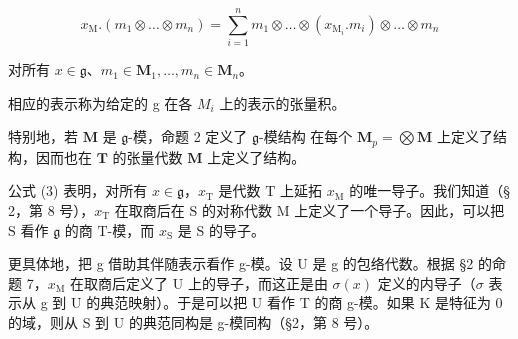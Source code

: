 \[
x _ {\mathrm{M}}. (m _ {1} \otimes \dots \otimes m _ {n}) = \sum_ {i = 1} ^ {n} m _ {1} \otimes \dots \otimes (x _ {\mathrm{M} _ {i}}. m _ {i}) \otimes \dots \otimes m _ {n}\tag{3}
\]

对所有 \(x \in \mathfrak{g}\)、\(m_1 \in \mathbf{M}_1, \ldots, m_n \in \mathbf{M}_n\)。

相应的表示称为给定的 g 在各 \(M_{i}\) 上的表示的张量积。

特别地，若 \(\mathbf{M}\) 是 \(\mathfrak{g}\)-模，命题 2 定义了 \(\mathfrak{g}\)-模结构
在每个 \(\mathbf{M}_p = \bigotimes \mathbf{M}\) 上定义了结构，因而也在 \(\mathbf{T}\) 的张量代数 \(\mathbf{M}\) 上定义了结构。

公式 (3) 表明，对所有 \(x \in \mathfrak{g}\)，\(x_{\mathrm{T}}\) 是代数 \(\mathrm{T}\) 上延拓 \(x_{\mathrm{M}}\) 的唯一导子。我们知道（§ 2，第 8 号），\(x_{\mathrm{T}}\) 在取商后在 \(\mathrm{S}\) 的对称代数 \(\mathrm{M}\) 上定义了一个导子。因此，可以把 \(\mathrm{S}\) 看作 \(\mathfrak{g}\) 的商 \(\mathrm{T}\)-模，而 \(x_{\mathrm{S}}\) 是 \(\mathrm{S}\) 的导子。

更具体地，把 g 借助其伴随表示看作 g-模。设 U 是 g 的包络代数。根据 §2 的命题 7，\(x_{\mathrm{M}}\) 在取商后定义了 U 上的导子，而这正是由 \(\sigma(x)\) 定义的内导子（\(\sigma\) 表示从 g 到 U 的典范映射）。于是可以把 U 看作 T 的商 g-模。如果 K 是特征为 0 的域，则从 S 到 U 的典范同构是 g-模同构（§2，第 8 号）。

